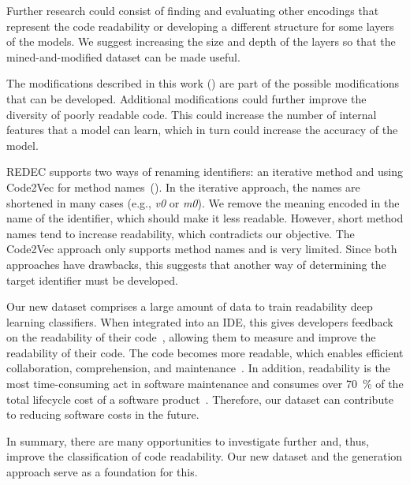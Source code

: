 \documentclass[%
class=scrreprt,
chapterprefix=false,%
open=right,%
twoside=true,%
paper=a4,%
logofile={Logo\_zentral\_farbig\_EN.png},%
thesistype=master,%
UKenglish,%
]{se2thesis}
\theoremstyle{definition}
\begin{document}
	Further research could consist of finding and evaluating other encodings that represent the code readability or developing a different structure for some layers of the models.
	We suggest increasing the size and depth of the layers so that the mined-and-modified dataset can be made useful.
	
    The modifications described in this work () are part of the possible modifications that can be developed. Additional modifications could further improve the diversity of poorly readable code. This could increase the number of internal features that a model can learn, which in turn could increase the accuracy of the model.
	
	REDEC supports two ways of renaming identifiers: an iterative method and using Code2Vec for method names~(). In the iterative approach, the names are shortened in many cases (e.g., \textit{v0} or \textit{m0}). We remove the meaning encoded in the name of the identifier, which should make it less readable. However, short method names tend to increase readability, which contradicts our objective. The Code2Vec approach only supports method names and is very limited. Since both approaches have drawbacks, this suggests that another way of determining the target identifier must be developed.

	Our new dataset comprises a large amount of data to train readability deep learning classifiers. When integrated into an IDE, this gives developers feedback on the readability of their code~\cite{choi2020metric}, allowing them to measure and improve the readability of their code. The code becomes more readable, which enables efficient collaboration, comprehension, and maintenance~\cite{posnett2011simpler, aggarwal2002integrated}.
	In addition, readability is the most time-consuming act in software maintenance and consumes over 70~\% of the total lifecycle cost of a software product~\cite{buse2009learning, deimel1985uses, rugaber2000use, boehm2001defect}. Therefore, our dataset can contribute to reducing software costs in the future.
	
	In summary, there are many opportunities to investigate further and, thus, improve the classification of code readability. Our new dataset and the generation approach serve as a foundation for this.
	
\authorshipDeclaration
	
\backmatter
\end{document}
